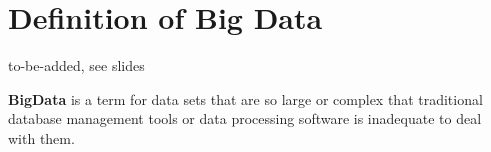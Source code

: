 \section{Definition of Big Data}
\label{bd_def}
to-be-added, see slides 
\\[0.5 cm]
\hspace*{4mm}%
\hspace*{4mm}%
\begin{minipage}{0.8\textwidth}\raggedright
\textbf{BigData} is a term for data sets that are so large or complex that traditional database management tools or data processing software is inadequate to deal with them. \\
\end{minipage}\\[0.4 cm]
